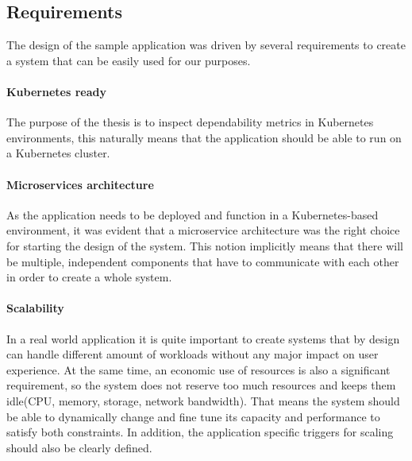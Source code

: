 \subsection{Requirements} \label{sample-app-requirements}


The design of the sample application was driven by several requirements to create a system that can be easily used for our purposes.

\paragraph{Kubernetes ready}The purpose of the thesis is to inspect dependability metrics in Kubernetes environments, this naturally means that the application should be able to run on a Kubernetes cluster.

\paragraph{Microservices architecture}As the application needs to be deployed and function in a Kubernetes-based environment, it was evident that a microservice architecture was the right choice for starting the design of the system. This notion implicitly means that there will be multiple, independent components that have to communicate with each other in order to create a whole system.

\paragraph{Scalability}In a real world application it is quite important to create systems that by design can handle different amount of workloads without any major impact on user experience. At the same time, an economic use of resources is also a significant requirement, so the system does not reserve too much resources and keeps them idle(\eg CPU, memory, storage, network bandwidth). That means the system should be able to dynamically change and fine tune its capacity and performance to satisfy both constraints. In addition, the application specific triggers for scaling should also be clearly defined.

